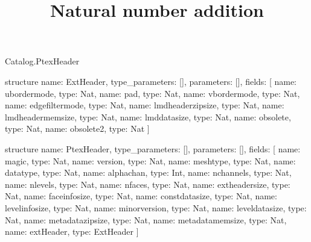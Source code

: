 \begin{lexlean}{Catalog.PtexHeader}
\title{Natural number addition}
\begin{semanticmodule}
structure{
  name: ExtHeader,
  type_parameters: [],
  parameters: [],
  fields: [
    {name: ubordermode, type: Nat},
    {name: pad, type: Nat},
    {name: vbordermode, type: Nat},
    {name: edgefiltermode, type: Nat},
    {name: lmdheaderzipsize, type: Nat},
    {name: lmdheadermemsize, type: Nat},
    {name: lmddatasize, type: Nat},
    {name: obsolete, type: Nat},
    {name: obsolete2, type: Nat}
  ]
}

structure{
  name: PtexHeader,
  type_parameters: [],
  parameters: [],
  fields: [
    {name: magic, type: Nat},
    {name: version, type: Nat},
    {name: meshtype, type: Nat},
    {name: datatype, type: Nat},
    {name: alphachan, type: Int},
    {name: nchannels, type: Nat},
    {name: nlevels, type: Nat},
    {name: nfaces, type: Nat},
    {name: extheadersize, type: Nat},
    {name: faceinfosize, type: Nat},
    {name: constdatasize, type: Nat},
    {name: levelinfosize, type: Nat},
    {name: minorversion, type: Nat},
    {name: leveldatasize, type: Nat},
    {name: metadatazipsize, type: Nat},
    {name: metadatamemsize, type: Nat},
    {name: extHeader, type: ExtHeader}
  ]
}
\end{semanticmodule}
\end{lexlean}
